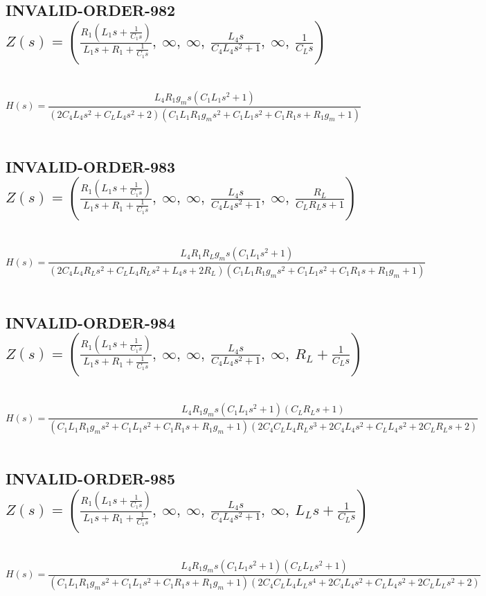 \documentclass{article}
\begin{document}
\subsection{INVALID-ORDER-982 $Z(s) = \left( \frac{R_{1} \left(L_{1} s + \frac{1}{C_{1} s}\right)}{L_{1} s + R_{1} + \frac{1}{C_{1} s}}, \  \infty, \  \infty, \  \frac{L_{4} s}{C_{4} L_{4} s^{2} + 1}, \  \infty, \  \frac{1}{C_{L} s}\right)$ } \ 
\textbf{\[H(s) = \frac{L_{4} R_{1} g_{m} s \left(C_{1} L_{1} s^{2} + 1\right)}{\left(2 C_{4} L_{4} s^{2} + C_{L} L_{4} s^{2} + 2\right) \left(C_{1} L_{1} R_{1} g_{m} s^{2} + C_{1} L_{1} s^{2} + C_{1} R_{1} s + R_{1} g_{m} + 1\right)}\] } \ 
\subsection{INVALID-ORDER-983 $Z(s) = \left( \frac{R_{1} \left(L_{1} s + \frac{1}{C_{1} s}\right)}{L_{1} s + R_{1} + \frac{1}{C_{1} s}}, \  \infty, \  \infty, \  \frac{L_{4} s}{C_{4} L_{4} s^{2} + 1}, \  \infty, \  \frac{R_{L}}{C_{L} R_{L} s + 1}\right)$ } \ 
\textbf{\[H(s) = \frac{L_{4} R_{1} R_{L} g_{m} s \left(C_{1} L_{1} s^{2} + 1\right)}{\left(2 C_{4} L_{4} R_{L} s^{2} + C_{L} L_{4} R_{L} s^{2} + L_{4} s + 2 R_{L}\right) \left(C_{1} L_{1} R_{1} g_{m} s^{2} + C_{1} L_{1} s^{2} + C_{1} R_{1} s + R_{1} g_{m} + 1\right)}\] } \ 
\subsection{INVALID-ORDER-984 $Z(s) = \left( \frac{R_{1} \left(L_{1} s + \frac{1}{C_{1} s}\right)}{L_{1} s + R_{1} + \frac{1}{C_{1} s}}, \  \infty, \  \infty, \  \frac{L_{4} s}{C_{4} L_{4} s^{2} + 1}, \  \infty, \  R_{L} + \frac{1}{C_{L} s}\right)$ } \ 
\textbf{\[H(s) = \frac{L_{4} R_{1} g_{m} s \left(C_{1} L_{1} s^{2} + 1\right) \left(C_{L} R_{L} s + 1\right)}{\left(C_{1} L_{1} R_{1} g_{m} s^{2} + C_{1} L_{1} s^{2} + C_{1} R_{1} s + R_{1} g_{m} + 1\right) \left(2 C_{4} C_{L} L_{4} R_{L} s^{3} + 2 C_{4} L_{4} s^{2} + C_{L} L_{4} s^{2} + 2 C_{L} R_{L} s + 2\right)}\] } \ 
\subsection{INVALID-ORDER-985 $Z(s) = \left( \frac{R_{1} \left(L_{1} s + \frac{1}{C_{1} s}\right)}{L_{1} s + R_{1} + \frac{1}{C_{1} s}}, \  \infty, \  \infty, \  \frac{L_{4} s}{C_{4} L_{4} s^{2} + 1}, \  \infty, \  L_{L} s + \frac{1}{C_{L} s}\right)$ } \ 
\textbf{\[H(s) = \frac{L_{4} R_{1} g_{m} s \left(C_{1} L_{1} s^{2} + 1\right) \left(C_{L} L_{L} s^{2} + 1\right)}{\left(C_{1} L_{1} R_{1} g_{m} s^{2} + C_{1} L_{1} s^{2} + C_{1} R_{1} s + R_{1} g_{m} + 1\right) \left(2 C_{4} C_{L} L_{4} L_{L} s^{4} + 2 C_{4} L_{4} s^{2} + C_{L} L_{4} s^{2} + 2 C_{L} L_{L} s^{2} + 2\right)}\] } \ 
\end{document}
